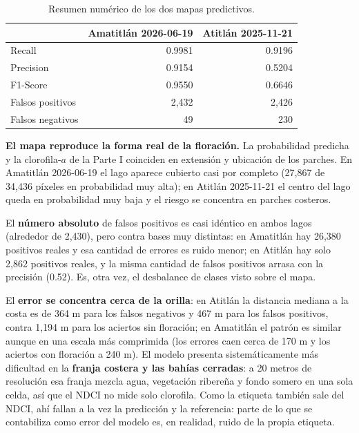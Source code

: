 \documentclass[11pt]{article}
\begin{document}
\begin{table}[H]
\centering
\caption{Resumen numérico de los dos mapas predictivos.}
\label{tab:resumen_mapas}
\begin{tabular}{lrr}
\toprule
 & Amatitlán 2026-06-19 & Atitlán 2025-11-21 \\
\midrule
Recall & 0.9981 & 0.9196 \\
Precision & 0.9154 & 0.5204 \\
F1-Score & 0.9550 & 0.6646 \\
Falsos positivos & 2{,}432 & 2{,}426 \\
Falsos negativos & 49 & 230 \\
\bottomrule
\end{tabular}
\end{table}

\textbf{El mapa reproduce la forma real de la floración.} La probabilidad predicha y la clorofila-\(a\) de la Parte I coinciden en extensión y ubicación de los parches. En Amatitlán 2026-06-19 el lago aparece cubierto casi por completo (27{,}867 de 34{,}436 píxeles en probabilidad muy alta); en Atitlán 2025-11-21 el centro del lago queda en probabilidad muy baja y el riesgo se concentra en parches costeros.

El \textbf{número absoluto} de falsos positivos es casi idéntico en ambos lagos (alrededor de 2{,}430), pero contra bases muy distintas: en Amatitlán hay 26{,}380 positivos reales y esa cantidad de errores es ruido menor; en Atitlán hay solo 2{,}862 positivos reales, y la misma cantidad de falsos positivos arrasa con la precisión (0.52). Es, otra vez, el desbalance de clases visto sobre el mapa.

El \textbf{error se concentra cerca de la orilla}: en Atitlán la distancia mediana a la costa es de 364 m para los falsos negativos y 467 m para los falsos positivos, contra 1{,}194 m para los aciertos sin floración; en Amatitlán el patrón es similar aunque en una escala más comprimida (los errores caen cerca de 170 m y los aciertos con floración a 240 m). El modelo presenta sistemáticamente más dificultad en la \textbf{franja costera y las bahías cerradas}: a 20 metros de resolución esa franja mezcla agua, vegetación ribereña y fondo somero en una sola celda, así que el NDCI no mide solo clorofila. Como la etiqueta también sale del NDCI, ahí fallan a la vez la predicción y la referencia: parte de lo que se contabiliza como error del modelo es, en realidad, ruido de la propia etiqueta.

\end{document}
